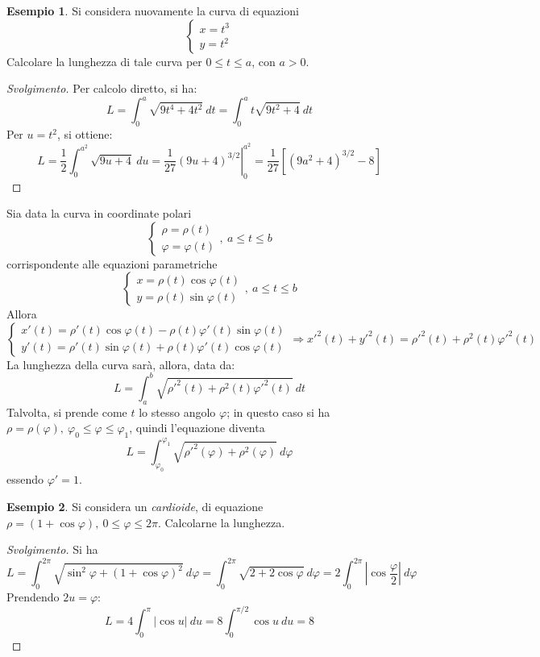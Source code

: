 \documentclass[11pt, a4paper]{scrartcl}
\newenvironment{svolgimento}{\renewcommand\qedsymbol{$\blacksquare$}\begin{proof}[Svolgimento]}{\end{proof}}
\theoremstyle{definition}
\newtheorem{esempio}{Esempio}
\numberwithin{esempio}{section}
\theoremstyle{definition}
\numberwithin{obs}{section}
\numberwithin{nota}{section}
\newcommand*\Eval[3]{\left.#1\right\rvert_{#2}^{#3}}
\numberwithin{equation}{subsection}
\begin{document}
\begin{esempio}
Si considera nuovamente la curva di equazioni 
\[
\begin{cases}
	x = t^3\\
	y = t^2
\end{cases}
\] 
Calcolare la lunghezza di tale curva per $0\le t\le a$, con $a > 0$.
\begin{svolgimento}
	Per calcolo diretto, si ha:
	\[
	L = \int_{0} ^a \sqrt{9t^4 + 4t^2} \ dt = \int_{0} ^a t\sqrt{9t^2 + 4} \ dt
	\] 
	Per $u = t^2$, si ottiene:
	\[
		L = \frac{1}{2} \int_{0} ^{a^2} \sqrt{9u + 4 }  \ du = \Eval{\frac{1}{27}(9u + 4)^{3 / 2} }{0}{a^2} = \frac{1}{27} \left[ \left(9a^2  + 4 \right) ^{3 / 2}  - 8 \right] 
	\] 
\end{svolgimento}
\end{esempio}
	Sia data la curva in coordinate polari
	\[
		\begin{cases}
	\rho  = \rho (t)\\
	\varphi = \varphi (t)
		\end{cases}, \ a\le t \le b
	\] 
corrispondente alle equazioni parametriche
\[
\begin{cases}
	 x = \rho (t) \cos \varphi (t) \\
	 y = \rho  (t) \sin \varphi (t)
\end{cases}, \ a \le t \le b
\] 
Allora 
\[
\begin{cases}
	x' (t) = \rho '(t) \cos \varphi (t) - \rho (t) \varphi '(t)\sin \varphi (t) \\
	y'(t) = \rho '(t) \sin \varphi (t) + \rho (t) \varphi '(t) \cos \varphi (t)
\end{cases} \Rightarrow x'^2 (t) + y'^2(t) = \rho '^2(t) + \rho ^2 (t) \varphi '^2(t)
\] 
La lunghezza della curva sar\`a, allora, data da:
\begin{equation}
	L = \int_{a} ^b \sqrt{\rho '^2(t) + \rho ^2 (t) \varphi '^2(t)} \ dt
\end{equation}
Talvolta, si prende come $t$ lo stesso angolo $\varphi $; in questo caso si ha $\rho  = \rho (\varphi ) , \ \varphi _0 \le  \varphi  \le \varphi _1$, quindi l'equazione diventa
\begin{equation}
	L = \int_{\varphi _0} ^{\varphi _1} \sqrt{\rho '^2(\varphi ) + \rho ^2 (\varphi )}  \ d\varphi 
\end{equation}
essendo $\varphi ' = 1$.
\begin{esempio}
Si considera un \textit{cardioide}, di equazione $\rho  = (1+ \cos\varphi ) , \ 0\le \varphi \le  2\pi $. Calcolarne la lunghezza.
\begin{svolgimento}
	Si ha 
	\[
	L = \int_{0} ^{2\pi} \sqrt{\sin^2 \varphi  + (1+ \cos\varphi )^2 }  \ d\varphi  = \int_{0} ^{2\pi} \sqrt{2 + 2 \cos \varphi  }  \ d\varphi = 2 \int_{0} ^{2\pi}\left\lvert \cos \frac{\varphi }{2}  \right\rvert   \ d\varphi 
	\] 
	Prendendo $2 u = \varphi $:
	\[
	L = 4 \int_{0} ^\pi \lvert \cos u \rvert  \ du = 8 \int_{0} ^{\pi / 2} \cos u \ du = 8 
	\] 
\end{svolgimento}
\end{esempio}
\end{document}
